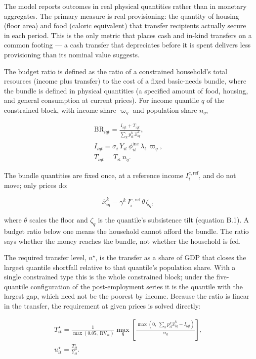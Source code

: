 \documentclass[preprint,review,12pt]{elsarticle}
\begin{document}
The model reports outcomes in real physical quantities rather than in
monetary aggregates. The primary measure is real provisioning: the
quantity of housing (floor area) and food (caloric equivalent) that
transfer recipients actually secure in each period. This is the only
metric that places cash and in-kind transfers on a common footing --- a
cash transfer that depreciates before it is spent delivers less
provisioning than its nominal value suggests.

The budget ratio is defined as the ratio of a constrained household's
total resources (income plus transfer) to the cost of a fixed
basic-needs bundle, where the bundle is defined in physical quantities
(a specified amount of food, housing, and general consumption at current
prices). For income quantile \(q\) of the constrained block, with income
share \(\varpi_q\) and population share \(n_q\),

\[\begin{gathered} \mathrm{BR}_{iqt} = \frac{I_{iqt} + T_{iqt}}{\sum_k p^k_{it} \, \hat{x}^k_{iq}}, \\ I_{iqt} = \sigma_i \, Y_{it} \, \phi^{\mathrm{inc}}_{it} \, \lambda_t \, \varpi_q, \\ T_{iqt} = T_{it} \, n_q. \end{gathered} \tag{41}\]

The bundle quantities are fixed once, at a reference income
\(I^{c,\mathrm{ref}}_i\), and do not move; only prices do:

\[\hat{x}^k_{iq} = \gamma^k \, I^{c,\mathrm{ref}}_i \, \theta \, \zeta_q, \tag{42}\]

where \(\theta\) scales the floor and \(\zeta_q\) is the quantile's
subsistence tilt (equation B.1). A budget ratio below one means the
household cannot afford the bundle. The ratio says whether the money
reaches the bundle, not whether the household is fed.

The required transfer level, \(u^\star\), is the transfer as a share of
GDP that closes the largest quantile shortfall relative to that
quantile's population share. With a single constrained type this is the
whole constrained block; under the five-quantile configuration of the
post-employment series it is the quantile with the largest gap, which
need not be the poorest by income. Because the ratio is linear in the
transfer, the requirement at given prices is solved directly:

\[\begin{gathered} T^\star_{it} = \frac{1}{\max\left( 0.05,\; \mathrm{RV}_{it} \right)} \max_q \left[ \frac{\max\left( 0,\; \sum_k p^k_{it} \hat{x}^k_{iq} - I_{iqt} \right)}{n_q} \right], \\ u^\star_{it} = \frac{T^\star_{it}}{Y_{it}}. \end{gathered} \tag{43}\]
\end{document}
